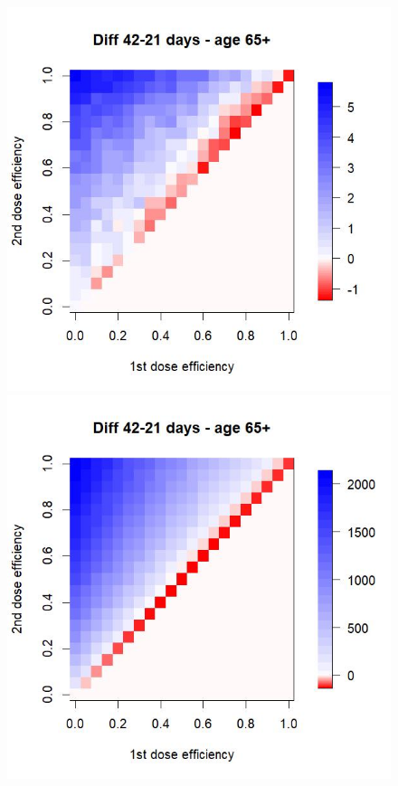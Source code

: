 \begin{figure}[h]
	\begin{center}
		\begin{minipage}[m]{0.3\linewidth}
			\includegraphics[width=\textwidth]{pic/SP_DIFF_mean_T.jpg}
		\end{minipage}
		\begin{minipage}[m]{0.3\linewidth}
			\includegraphics[width=\textwidth]{pic/SL_DIFF_mean_T.jpg}

\end{minipage}
\end{center}
\end{figure}
